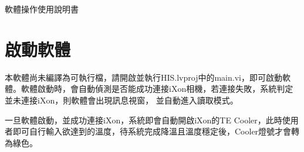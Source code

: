 \documentclass[12pt]{article}
\begin{document}
    \newline
    {\large 軟體操作使用說明書}\newpage
    \tableofcontents\newpage
    \section{啟動軟體}
    本軟體尚未編譯為可執行檔，請開啟並執行HIS.lvproj中的main.vi，即可啟動軟體。軟體啟動時，會自動偵測是否能成功連接iXon相機，若連接失敗，系統判定並未連接iXon，則軟體會出現訊息視窗，
    並自動進入讀取模式。
    
    一旦軟體啟動，並成功連接iXon，系統即會自動開啟iXon的TE Cooler，此時使用者即可自行輸入欲達到的溫度，待系統完成降溫且溫度穩定後，Cooler燈號才會轉為綠色。
\end{document}
